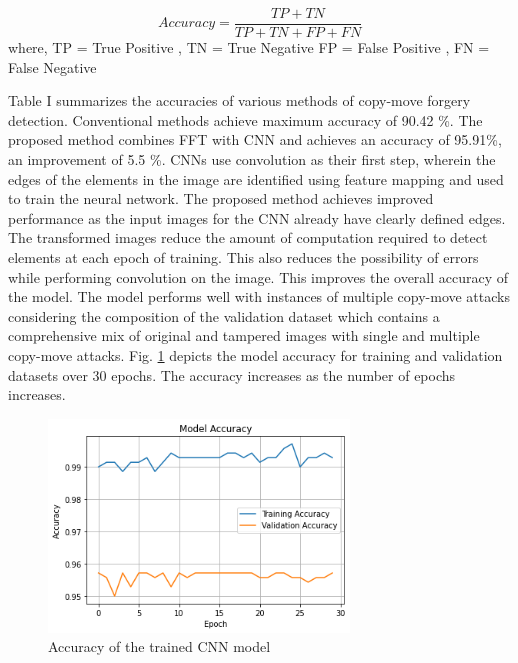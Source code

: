 \documentclass[conference]{IEEEtran}
\begin{document}
\begin{equation}
   Accuracy = \frac{TP +TN}{TP +TN + FP +FN}
\end{equation}
where,
\newline
TP = True Positive , TN = True Negative \newline
FP = False Positive , FN = False Negative  

\begin{table}[htpb]
\centering
\caption{\label{tab:acc}Accuracies of various detection methods}
\end{table}

Table I summarizes the accuracies of various methods of copy-move forgery detection. Conventional methods achieve maximum accuracy of 90.42 \%. The proposed method combines FFT with CNN and achieves an accuracy of 95.91\%, an improvement of 5.5 \%. CNNs use convolution as their first step, wherein the edges of the elements in the image are identified using feature mapping and used to train the neural network. The proposed method achieves improved performance as the input images for the CNN already have clearly defined edges. The transformed images reduce the amount of computation required to detect elements at each epoch of training. This also reduces the possibility of errors while performing convolution on the image. This improves the overall accuracy of the model. The model performs well with instances of multiple copy-move attacks considering the composition of the validation dataset which contains a comprehensive mix of original and tampered images with single and multiple copy-move attacks. Fig. \ref{accuracy} depicts the model accuracy for training and validation datasets over 30 epochs. The accuracy increases as the number of epochs increases.

\begin{figure}[htpb]
\centerline{\includegraphics[width=8cm]{accuracy.png}}
\caption{Accuracy of the trained CNN model}
\label{accuracy}
\end{figure}
\end{document}
